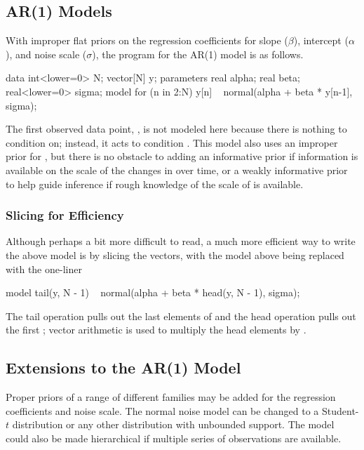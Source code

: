 \subsection{AR(1) Models}

With improper flat priors on the regression coefficients for slope
($\beta$), intercept ($\alpha$), and noise scale ($\sigma$),
the \Stan program for the AR(1) model is as follows.
%
\begin{stancode}
data {
  int<lower=0> N;
  vector[N] y;
}
parameters {
  real alpha;
  real beta;
  real<lower=0> sigma;
}
model {
  for (n in 2:N)
    y[n] ~ normal(alpha + beta * y[n-1], sigma);
}
\end{stancode}
%
The first observed data point, , is not modeled here
because there is nothing to condition on; instead, it acts to
condition .  This model also uses an improper prior for
, but there is no obstacle to adding an informative prior
if information is available on the scale of the changes in 
over time, or a weakly informative prior to help guide inference if
rough knowledge of the scale of  is available.

\subsubsection{Slicing for Efficiency}

Although perhaps a bit more difficult to read, a much more efficient
way to write the above model is by slicing the vectors, with the model
above being replaced with the one-liner
%
\begin{stancode}
model {
  tail(y, N - 1) ~ normal(alpha + beta * head(y, N - 1), sigma);
}
\end{stancode}
%
The tail operation pulls out the last  elements of
 and the head operation pulls out the first ;
vector arithmetic is used to multiply the head elements by
.  



\subsection{Extensions to the AR(1) Model} 

Proper priors of a range of different families may be added for the
regression coefficients and noise scale.  The normal noise model can
be changed to a Student-$t$ distribution or any other distribution
with unbounded support.  The model could also be made hierarchical if
multiple series of observations are available.  

